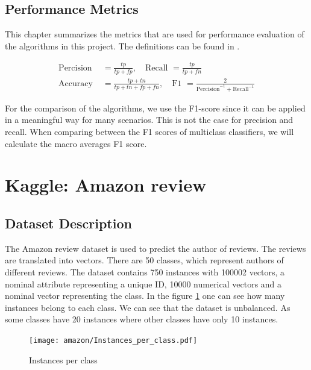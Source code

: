 \documentclass[11pt]{article}
\begin{document}
\subsection{Performance Metrics}

This chapter summarizes the metrics that are used for performance evaluation of the algorithms in this project. The definitions can be found in \cite{shalev2014}.

\begin{align}
\text{Percision } &= \frac{tp}{tp+fp}, \quad \text{Recall } = \frac{tp}{tp+fn}\\ 
\text{Accuracy } &= \frac{tp+tn}{tp+tn+fp+fn}, \quad \text{F1 } = \frac{2}{\text{Percision}^{-1}+ \text{Recall}^{-1}}
\end{align}

For the comparison of the algorithms, we use the F1-score since it can be applied in a meaningful way for many scenarios. This is not the case for precision and recall. When comparing between the F1 scores of multiclass classifiers, we will calculate the macro averages F1 score.

\section{Kaggle: Amazon review}
\subsection{Dataset Description} 
The Amazon review dataset is used to predict the author of reviews. The reviews are translated into vectors. There are 50 classes, which represent authors of different reviews. The dataset contains 750 instances with 100002 vectors, a nominal attribute representing a unique ID, 10000 numerical vectors and a nominal vector representing the class.
\newline 
In the figure \ref{Fig::Instances_per_class} one can see how many instances belong to each class. We can see that the dataset is unbalanced. As some classes have 20 instances where other classes have only 10 instances.
%
\begin{figure}[h]
\begin{minipage}[t]{0.8\textwidth}
\texttt{[image: amazon/Instances\_per\_class.pdf]}
\end{minipage}
\caption{Instances per class}
\label{Fig::Instances_per_class}
\end{figure}
%
\end{document}
